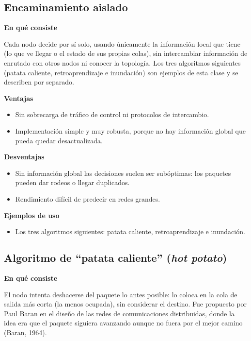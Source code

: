 \documentclass[12pt,letterpaper]{article}
\newcommand{\rub}[1]{\par\medskip\noindent\textbf{#1}\par\nopagebreak}
\begin{document}
\subsection{Encaminamiento aislado}
\rub{En qué consiste}
Cada nodo decide por sí solo, usando únicamente la información local que tiene (lo que ve llegar o el estado de sus propias colas), sin intercambiar información de enrutado con otros nodos ni conocer la topología. Los tres algoritmos siguientes (patata caliente, retroaprendizaje e inundación) son ejemplos de esta clase y se describen por separado.
\rub{Ventajas}
\begin{itemize}[itemsep=2pt]
\item Sin sobrecarga de tráfico de control ni protocolos de intercambio.
\item Implementación simple y muy robusta, porque no hay información global que pueda quedar desactualizada.
\end{itemize}
\rub{Desventajas}
\begin{itemize}[itemsep=2pt]
\item Sin información global las decisiones suelen ser subóptimas: los paquetes pueden dar rodeos o llegar duplicados.
\item Rendimiento difícil de predecir en redes grandes.
\end{itemize}
\rub{Ejemplos de uso}
\begin{itemize}[itemsep=2pt]
\item Los tres algoritmos siguientes: patata caliente, retroaprendizaje e inundación.
\end{itemize}

\subsection{Algoritmo de ``patata caliente'' (\emph{hot potato})}
\rub{En qué consiste}
El nodo intenta deshacerse del paquete lo antes posible: lo coloca en la cola de salida más corta (la menos ocupada), sin considerar el destino. Fue propuesto por Paul Baran en el diseño de las redes de comunicaciones distribuidas, donde la idea era que el paquete siguiera avanzando aunque no fuera por el mejor camino (Baran, 1964).
\end{document}
